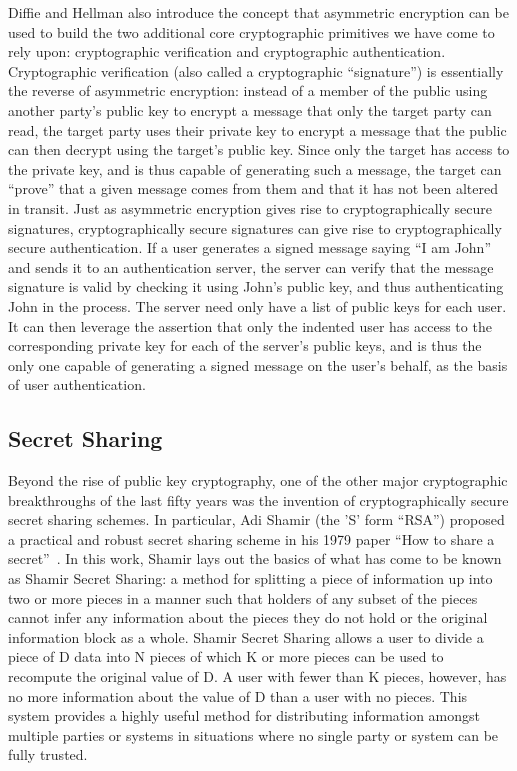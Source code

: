 Diffie and Hellman also introduce the concept that asymmetric
encryption can be used to build the two additional core cryptographic
primitives we have come to rely upon: cryptographic verification and
cryptographic authentication. Cryptographic verification (also called
a cryptographic ``signature'') is essentially the reverse of
asymmetric encryption: instead of a member of the public using another
party's public key to encrypt a message that only the target party can
read, the target party uses their private key to encrypt a message
that the public can then decrypt using the target's public key. Since
only the target has access to the private key, and is thus capable of
generating such a message, the target can ``prove'' that a given
message comes from them and that it has not been altered in
transit. Just as asymmetric encryption gives rise to cryptographically
secure signatures, cryptographically secure signatures can give rise
to cryptographically secure authentication. If a user generates a
signed message saying ``I am John'' and sends it to an authentication
server, the server can verify that the message signature is valid by
checking it using John's public key, and thus authenticating John in
the process. The server need only have a list of public keys for each
user. It can then leverage the assertion that only the indented user
has access to the corresponding private key for each of the server's
public keys, and is thus the only one capable of generating a signed
message on the user's behalf, as the basis of user authentication.

\subsection{Secret Sharing}

Beyond the rise of public key cryptography, one of the other major
cryptographic breakthroughs of the last fifty years was the invention
of cryptographically secure secret sharing schemes. In particular, Adi
Shamir (the 'S' form ``RSA'') proposed a practical and robust secret
sharing scheme in his 1979 paper ``How to share a
secret''~\cite{Shamir1979}. In this work, Shamir lays out the basics
of what has come to be known as Shamir Secret Sharing: a method for
splitting a piece of information up into two or more pieces in a
manner such that holders of any subset of the pieces cannot infer any
information about the pieces they do not hold or the original
information block as a whole. Shamir Secret Sharing allows a user to
divide a piece of D data into N pieces of which K or more pieces can
be used to recompute the original value of D. A user with fewer than K
pieces, however, has no more information about the value of D than a
user with no pieces. This system provides a highly useful method for
distributing information amongst multiple parties or systems in
situations where no single party or system can be fully trusted.

